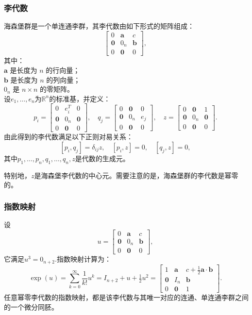 \subsubsection{李代数}
海森堡群是一个单连通李群，其李代数由如下形式的矩阵组成：
$$
\begin{bmatrix}
0 & \mathbf{a} & c \\
\mathbf{0} & 0_{n} & \mathbf{b} \\
0 & \mathbf{0} & 0
\end{bmatrix},~
$$
其中：\\
$\mathbf{a}$ 是长度为 $n$ 的行向量；\\
$\mathbf{b}$ 是长度为 $n$ 的列向量；\\
$0_{n}$ 是 $n \times n$ 的零矩阵。\\
设$e_{1}, \ldots, e_{n}$为$\mathbb{R}^{n}$的标准基，并定义：
$$
p_{i} =
\begin{bmatrix}
0 & e_{i}^{T} & 0 \\
\mathbf{0} & 0_{n} & \mathbf{0} \\
0 & \mathbf{0} & 0
\end{bmatrix}, \quad
q_{j} =
\begin{bmatrix}
0 & \mathbf{0} & 0 \\
\mathbf{0} & 0_{n} & e_{j} \\
0 & \mathbf{0} & 0
\end{bmatrix}, \quad
z =
\begin{bmatrix}
0 & \mathbf{0} & 1 \\
\mathbf{0} & 0_{n} & \mathbf{0} \\
0 & \mathbf{0} & 0
\end{bmatrix}.~
$$
由此得到的李代数满足以下正则对易关系：
$$
[p_{i}, q_{j}] = \delta_{ij} z, \quad [p_{i}, z] = 0, \quad [q_{j}, z] = 0,~
$$
其中$p_{1}, \ldots, p_{n}, q_{1}, \ldots, q_{n}, z$是代数的生成元。

特别地，$z$是海森堡李代数的中心元。需要注意的是，海森堡群的李代数是幂零的。
\subsubsection{指数映射}
设
$$
u = 
\begin{bmatrix}
0 & \mathbf{a} & c \\
\mathbf{0} & 0_{n} & \mathbf{b} \\
0 & \mathbf{0} & 0
\end{bmatrix},~
$$
它满足$u^{3} = 0_{n+2}$.指数映射计算为：
$$
\exp(u) = \sum_{k=0}^{\infty} \frac{1}{k!} u^{k} 
= I_{n+2} + u + \tfrac{1}{2} u^{2} 
= 
\begin{bmatrix}
1 & \mathbf{a} & c + \tfrac{1}{2}\mathbf{a} \cdot \mathbf{b} \\
\mathbf{0} & I_{n} & \mathbf{b} \\
0 & \mathbf{0} & 1
\end{bmatrix}.~
$$
任意幂零李代数的指数映射，都是该李代数与其唯一对应的连通、单连通李群之间的一个微分同胚。

